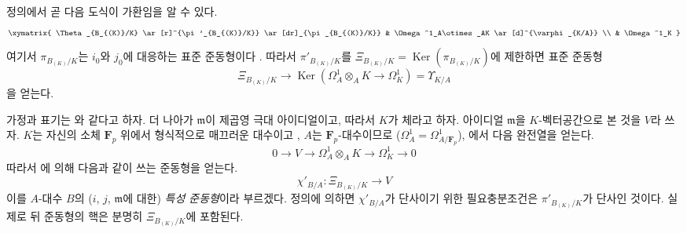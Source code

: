 \begin{env}[22.4.5]

정의에서 곧 다음 도식이 가환임을 알 수 있다.
\[
  \xymatrix{
    \Theta_{B_{(K)}/K} \ar[r]^{\pi'_{B_{(K)}/K}} \ar[dr]_{\pi_{B_{(K)}/K}}
      & \Omega^1_A\otimes_AK \ar[d]^{\varphi_{K/A}} \\
    & \Omega^1_K
  }
\]
여기서 $\pi_{B_{(K)}/K}$는 $i_0$와 $j_0$에 대응하는 표준 준동형이다
. 따라서 $\pi'_{B_{(K)}/K}$를
$\Xi_{B_{(K)}/K}=\operatorname{Ker}(\pi_{B_{(K)}/K})$에 제한하면
표준 준동형
\begin{equation}
\label{0.22.4.5.3-ko}
  \Xi_{B_{(K)}/K}\longrightarrow
  \operatorname{Ker}(\Omega^1_A\otimes_AK\longrightarrow\Omega^1_K)=\Upsilon_{K/A}
  \tag{22.4.5.3}
\end{equation}
을 얻는다.
\end{env}

\begin{env}[22.4.6]
\label{0.22.4.6-ko}
가정과 표기는 와 같다고 하자. 더 나아가
$\mathfrak m$이 제곱영 극대 아이디얼이고, 따라서 $K$가 체라고 하자.
아이디얼 $\mathfrak m$을 $K$-벡터공간으로 본 것을 $V$라 쓰자.
$K$는 자신의 소체 $\mathbf F_p$ 위에서 형식적으로 매끄러운 대수이고
, $A$는 $\mathbf F_p$-대수이므로
($\Omega^1_A=\Omega^1_{A/\mathbf F_p}$), 에서
다음 완전열을 얻는다.
\begin{equation}
\label{0.22.4.6.1-ko}
  0\longrightarrow V\longrightarrow\Omega^1_A\otimes_AK
  \longrightarrow\Omega^1_K\longrightarrow0
  \tag{22.4.6.1}
\end{equation}
따라서 에 의해 다음과 같이 쓰는 준동형을 얻는다.
\begin{equation}
\label{0.22.4.6.2-ko}
  \chi'_{B/A}:\Xi_{B_{(K)}/K}\longrightarrow V
  \tag{22.4.6.2}
\end{equation}
이를 $A$-대수 $B$의 ($i$, $j$, $\mathfrak m$에 대한)
\emph{특성 준동형}이라 부르겠다. 정의에 의하면
$\chi'_{B/A}$가 단사이기 위한 필요충분조건은
$\pi'_{B_{(K)}/K}$가 단사인 것이다. 실제로 뒤 준동형의 핵은 분명히
$\Xi_{B_{(K)}/K}$에 포함된다.
\end{env}

